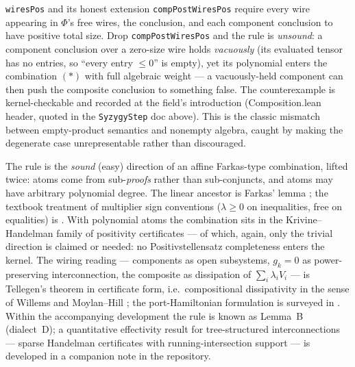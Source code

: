 \begin{bremark}
\label{rem:syz-b14}
\texttt{wiresPos} and its honest extension \texttt{compPostWiresPos}
require every wire appearing in $\Phi$'s free wires, the conclusion, and
each component conclusion to have positive total size. Drop
\texttt{compPostWiresPos} and the rule is \emph{unsound}: a component
conclusion over a zero-size wire holds \emph{vacuously} (its evaluated
tensor has no entries, so ``every entry $\leq 0$'' is empty), yet its
polynomial enters the combination $(\ast)$ with full algebraic weight ---
a vacuously-held component can then push the composite conclusion to
something false. The counterexample is kernel-checkable and recorded at
the field's introduction (Composition.lean header, quoted in the
\texttt{SyzygyStep} doc above). This is the classic mismatch between
empty-product semantics and nonempty algebra, caught by making the
degenerate case unrepresentable rather than discouraged.
\end{bremark}

\begin{bremark}
The rule is the \emph{sound} (easy) direction of an affine Farkas-type
combination, lifted twice: atoms come from sub-\emph{proofs} rather than
sub-conjuncts, and atoms may have arbitrary polynomial degree. The linear
ancestor is Farkas' lemma \cite{farkas1902}; the textbook treatment of
multiplier sign conventions ($\lambda \geq 0$ on inequalities, free on
equalities) is \cite[\S7]{schrijver1986}. With polynomial atoms the
combination sits in the Krivine--Handelman family of positivity
certificates \cite{krivine1964,handelman1988} --- of which, again, only
the trivial direction is claimed or needed: no Positivstellensatz
completeness enters the kernel. The wiring reading --- components as
open subsystems, $g_k = 0$ as power-preserving interconnection, the
composite as dissipation of $\sum_i \lambda_i V_i$ --- is Tellegen's
theorem \cite{tellegen1952} in certificate form, i.e.\ compositional
dissipativity in the sense of Willems \cite{willems1972} and
Moylan--Hill \cite{moylanhill1978}; the port-Hamiltonian formulation is
surveyed in \cite{vanderschaftjeltsema2014}. Within the accompanying
development the rule is known as Lemma~B (dialect~D); a quantitative
effectivity result for tree-structured interconnections --- sparse
Handelman certificates with running-intersection support --- is developed
in a companion note in the repository.
\end{bremark}

